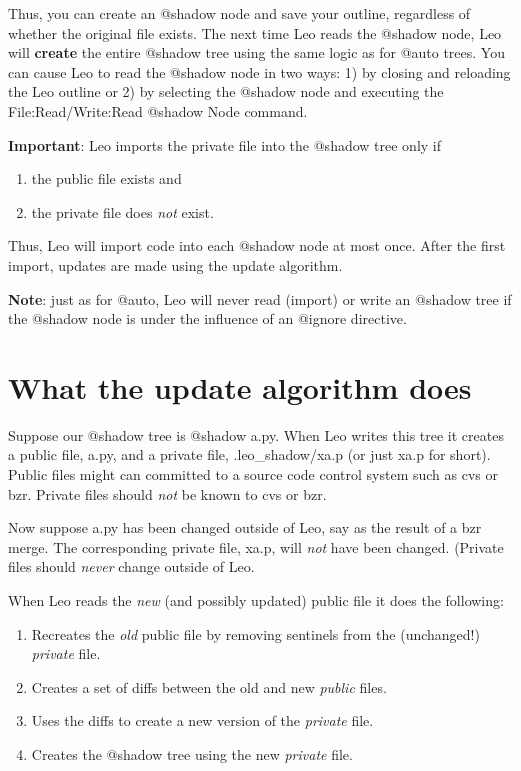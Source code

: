 \documentclass[a4paper,10pt,english]{sphinxmanual}
\begin{document}
Thus, you can create an @shadow node and save your outline, regardless of
whether the original file exists. The next time Leo reads the @shadow node, Leo
will \textbf{create} the entire @shadow tree using the same logic as for @auto
trees. You can cause Leo to read the @shadow node in two ways: 1) by closing
and reloading the Leo outline or 2) by selecting the @shadow node and executing
the File:Read/Write:Read @shadow Node command.

\textbf{Important}: Leo imports the private file into the @shadow tree only if
\begin{enumerate}
\item {} 
the public file exists and

\item {} 
the private file does \emph{not} exist.

\end{enumerate}

Thus, Leo will import code into each @shadow node at most once. After the first
import, updates are made using the update algorithm.

\textbf{Note}: just as for @auto, Leo will never read (import) or write an @shadow
tree if the @shadow node is under the influence of an @ignore directive.


\section{What the update algorithm does}
\label{atShadow:what-the-update-algorithm-does}
Suppose our @shadow tree is @shadow a.py. When Leo writes this tree it creates a
public file, a.py, and a private file, .leo\_shadow/xa.p (or just xa.p for
short). Public files might can committed to a source code control system such as
cvs or bzr. Private files should \emph{not} be known to cvs or bzr.

Now suppose a.py has been changed outside of Leo, say as the result of a bzr
merge. The corresponding private file, xa.p, will \emph{not} have been changed.
(Private files should \emph{never} change outside of Leo.

When Leo reads the \emph{new} (and possibly updated) public file it does the
following:
\begin{enumerate}
\item {} 
Recreates the \emph{old} public file by removing sentinels from the (unchanged!) \emph{private} file.

\item {} 
Creates a set of diffs between the old and new \emph{public} files.

\item {} 
Uses the diffs to create a new version of the \emph{private} file.

\item {} 
Creates the @shadow tree using  the new \emph{private} file.

\end{enumerate}
\end{document}
